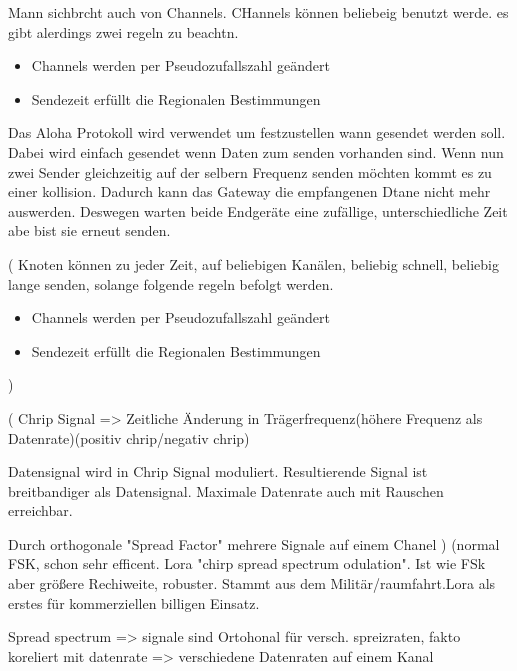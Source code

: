 \documentclass[a4paper,12pt]{article}
\begin{document}
            
            Mann sichbrcht auch von Channels. CHannels können beliebeig benutzt werde. es gibt alerdings zwei regeln zu beachtn. 
            \begin{itemize}   
                \item Channels werden per Pseudozufallszahl geändert
                \item Sendezeit erfüllt die Regionalen Bestimmungen
            \end{itemize}

            Das Aloha Protokoll wird verwendet um festzustellen wann gesendet werden soll. Dabei wird einfach gesendet wenn Daten zum senden vorhanden sind. Wenn nun zwei Sender gleichzeitig auf der selbern Frequenz senden möchten kommt es zu einer kollision. 
            Dadurch kann das Gateway die empfangenen Dtane nicht mehr auswerden. Deswegen warten beide Endgeräte eine zufällige, unterschiedliche Zeit abe bist sie erneut senden.

            \cite{LoRaSpec}(
                Knoten können zu jeder Zeit, auf beliebigen Kanälen, beliebig schnell, beliebig lange senden, solange folgende regeln befolgt werden.
                \begin{itemize}
                    
                        \item Channels werden per Pseudozufallszahl geändert
                        \item Sendezeit erfüllt die Regionalen Bestimmungen
                    
                \end{itemize}
            )

            \cite{LoraLimit}(
                Chrip Signal => Zeitliche Änderung in Trägerfrequenz(höhere Frequenz als Datenrate)(positiv chrip/negativ chrip)

                Datensignal wird in Chrip Signal moduliert. Resultierende Signal ist breitbandiger als Datensignal. Maximale Datenrate auch mit Rauschen erreichbar.

                Durch orthogonale "Spread Factor" mehrere Signale auf einem Chanel
            )
            \cite{WhatIsLoRa}(normal FSK, schon sehr efficent. Lora "chirp spread spectrum odulation". Ist wie FSk aber größere Rechiweite, robuster. Stammt aus dem Militär/raumfahrt.Lora als erstes für kommerziellen billigen Einsatz.
            
            Spread spectrum => signale sind Ortohonal für versch. spreizraten, fakto koreliert mit datenrate => verschiedene Datenraten auf einem Kanal
            
\end{document}
